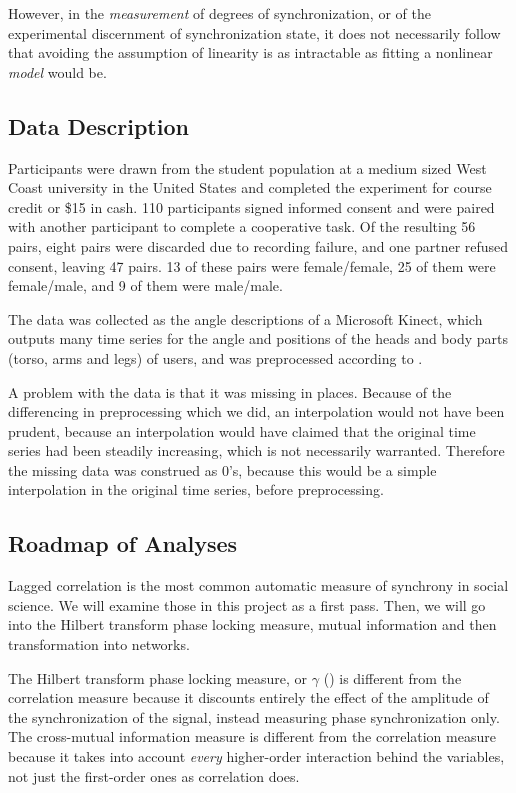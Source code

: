 \documentclass[12pt]{article}
\begin{document}
However, in the \emph{measurement} of degrees of synchronization, or of the experimental discernment of synchronization state, it does not necessarily follow that avoiding the assumption of linearity is as intractable as fitting a nonlinear \emph{model} would be.

\subsection{Data Description}

Participants were drawn from the student population at a medium sized West Coast university in the United States and completed the experiment for course credit or \$15 in cash. 110 participants signed informed consent and were paired with another participant to complete a cooperative task.  Of the resulting 56 pairs, eight pairs were discarded due to recording failure, and one partner refused consent, leaving 47 pairs. 13 of these pairs were female/female, 25 of them were female/male, and 9 of them were male/male.

The data was collected as the angle descriptions of a Microsoft Kinect, which outputs many time series for the angle and positions of the heads and body parts (torso, arms and legs) of users, and was preprocessed according to \cite{andrea}.

A problem with the data is that it was missing in places. Because of the differencing in preprocessing which we did, an interpolation would not have been prudent, because an interpolation would have claimed that the original time series had been steadily increasing, which is not necessarily warranted. Therefore the missing data was construed as 0's, because this would be a simple interpolation in the original time series, before preprocessing.

\subsection{Roadmap of Analyses}

Lagged correlation is the most common automatic measure of synchrony in social science\cite{socialsync}. We will examine those in this project as a first pass. Then, we will go into the Hilbert transform phase locking measure, mutual information and then transformation into networks.

The Hilbert transform phase locking measure, or $\gamma$ (\cite{gamma}) is different from the correlation measure because it discounts entirely the effect of the amplitude of the synchronization of the signal, instead measuring phase synchronization only. The cross-mutual information measure \cite{pompe} is different from the correlation measure because it takes into account \emph{every} higher-order interaction behind the variables, not just the first-order ones as correlation does.
\end{document}
